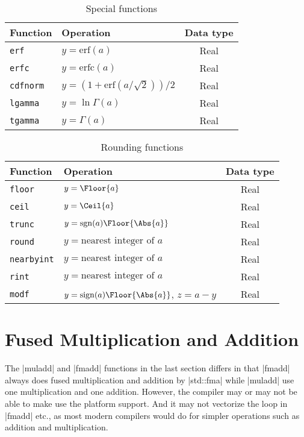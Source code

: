 \begin{table}
  \begin{tabularx}{\textwidth}{LLC}
    \toprule
    Function & Operation & Data type \\
    \midrule
    \texttt{erf}     & $y = \mathrm{erf}(a)$  & Real \\
    \texttt{erfc}    & $y = \mathrm{erfc}(a)$ & Real \\
    \texttt{cdfnorm} & $y = (1 + \mathrm{erf}(a / \sqrt{2})) / 2$ & Real \\
    \texttt{lgamma}  & $y = \ln\Gamma(a)$     & Real \\
    \texttt{tgamma}  & $y = \Gamma(a)$        & Real \\
    \bottomrule
  \end{tabularx}
  \caption{Special functions}
  \label{tab:Special functions}
\end{table}

\begin{table}
  \begin{tabularx}{\textwidth}{LLC}
    \toprule
    Function & Operation & Data type \\
    \midrule
    \texttt{floor} & $y = \Floor{a}$                       & Real \\
    \texttt{ceil}  & $y = \Ceil{a}$                        & Real \\
    \texttt{trunc} & $y = \mathrm{sgn}(a)\Floor{\Abs{a}}$  & Real \\
    \texttt{round} & $y = \text{nearest integer of }a$     & Real \\
    \texttt{nearbyint} & $y = \text{nearest integer of }a$ & Real \\
    \texttt{rint}  & $y = \text{nearest integer of }a$     & Real \\
    \texttt{modf}&$y = \mathrm{sign}(a)\Floor{\Abs{a}}$, $z = a - y$ & Real \\
    \bottomrule
  \end{tabularx}
  \caption{Rounding functions}
  \label{tab:Rounding functions}
\end{table}

\clearpage

\section{Fused Multiplication and Addition}
\label{sec:Fused Multiplication and Addition}

The |muladd| and |fmadd| functions in the last section differs in that |fmadd|
always does fused multiplication and addition by |std::fma| while |muladd| use
one multiplication and one addition. However, the compiler may or may not be
able to make use the platform \fma support. And it may not vectorize the loop
in |fmadd| etc., as most modern \cpp compilers would do for simpler operations
such as addition and multiplication.

